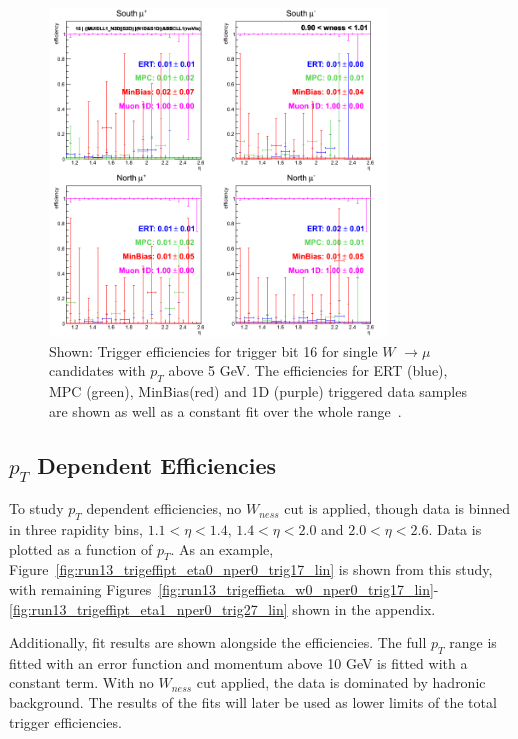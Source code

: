 \begin{figure}[ht]
  \centering
  \includegraphics[width=0.8\textwidth]{./figures/run13_trigeffieta_w1_trig16_lin.png}
  \caption{
    Shown: Trigger efficiencies for trigger bit 16 for single $W$ $\rightarrow
    \mu$ candidates with $p_T$ above 5 GeV. The efficiencies for ERT (blue), MPC
    (green), MinBias(red) and 1D (purple) triggered data samples are shown as
    well as a constant fit over the whole range~\cite{Seidl2014}.
  }
  \label{fig:run13_trigeffieta_w0_nper0_trig16_lin} 
\end{figure}

\clearpage
\subsection{$p_T$ Dependent Efficiencies}
To study $p_T$ dependent efficiencies, no $W_{ness}$ cut is
applied, though data is binned in three rapidity bins, $1.1 < \eta < 1.4$, $1.4
< \eta < 2.0$ and $2.0 < \eta < 2.6 $. Data is plotted as a function of $p_T$.
As an example, Figure~\ref{fig:run13_trigeffipt_eta0_nper0_trig17_lin} is shown
from this study, with remaining
Figures~\ref{fig:run13_trigeffieta_w0_nper0_trig17_lin}-\ref{fig:run13_trigeffipt_eta1_nper0_trig27_lin}
shown in the appendix.

Additionally, fit results are shown alongside the efficiencies. The full $p_T$
range is fitted with an error function and momentum above 10 GeV is fitted with
a constant term. With no $W_{ness}$ cut applied, the data is dominated by
hadronic background. The results of the fits will later be used as lower limits
of the total trigger efficiencies. 

